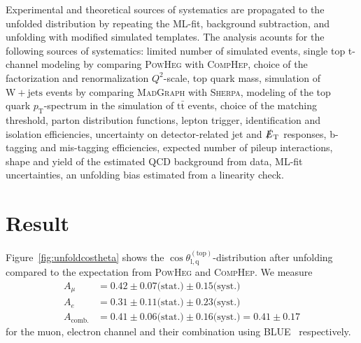 \documentclass[a4paper]{jpconf}
\newcommand{\wjets}[0]{\mathrm{W+jets}}
\newcommand{\ttbar}[0]{\ensuremath{\mathrm{t\bar{t}}}}
\newcommand{\costheta}[0]{\cos\theta_{\mathrm{l,q}}^{\mathrm{(top)}}}
\newcommand{\pT}[0]{\ensuremath{p_\mathrm{T}}}
\newcommand{\met}[0]{\ensuremath{\slashed E_\mathrm{T}}}
\begin{document}
Experimental and theoretical sources of systematics are propagated to the unfolded distribution by repeating the ML-fit, background subtraction, and unfolding with modified simulated templates. The analysis acounts for the following sources of systematics: limited number of simulated events, single top t-channel modeling by comparing \textsc{PowHeg} with \textsc{CompHep}, choice of the factorization and renormalization $Q^{2}$-scale, top quark mass, simulation of $\wjets$ events by comparing \textsc{MadGraph} with \textsc{Sherpa}, modeling of the  top quark $\pT$-spectrum in the simulation of $\ttbar$ events, choice of the matching threshold, parton distribution functions, lepton trigger, identification and isolation efficiencies, uncertainty on detector-related jet and $\met$ responses, b-tagging and mis-tagging efficiencies, expected number of pileup interactions, shape and yield of the estimated QCD background from data, ML-fit uncertainties, an unfolding bias estimated from a linearity check.






\section{Result}

Figure~\ref{fig:unfoldcostheta} shows the $\costheta$-distribution after unfolding compared to the expectation from \textsc{PowHeg} and \textsc{CompHep}. We measure
\begin{align}
A_{\mu}&=0.42\pm 0.07 \textrm{(stat.)} \pm 0.15 \textrm{(syst.)} \\
A_{e}&=0.31\pm 0.11 \textrm{(stat.)} \pm 0.23 \textrm{(syst.)} \\
A_{\mathrm{comb.}}&=0.41\pm 0.06 \textrm{(stat.)} \pm 0.16 \textrm{(syst.)} = 0.41\pm 0.17
\end{align}
for the muon, electron channel and their combination using BLUE~\cite{blue} respectively.
\end{document}
